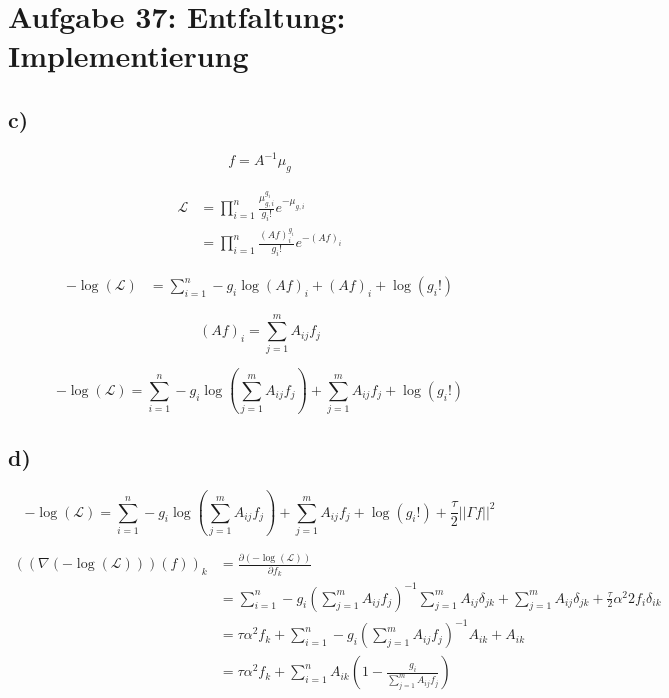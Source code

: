 \section*{Aufgabe 37: Entfaltung: Implementierung}
\label{sec:Aufgabe1}

\subsection*{c)}

\begin{equation}
    f = A^{-1}\mu_g
\end{equation}

\begin{align}
    \mathcal{L} &= \prod_{i=1}^n \frac{\mu_{g,i}^{g_i}}{g_i!}e^{-\mu_{g,i}}\nonumber\\
                &= \prod_{i=1}^n \frac{\left(Af\right)_i^{g_i}}{g_i!}e^{-\left(Af\right)_i}
\end{align}

\begin{align}
    -\log\left(\mathcal{L}\right) &= \sum_{i=1}^n -g_i \log\left(Af\right)_i + \left(Af\right)_i + \log\left(g_i!\right)
\end{align}

\begin{equation}
    \left(Af\right)_i = \sum_{j=1}^m A_{ij}f_j
\end{equation}

\begin{equation}
    -\log\left(\mathcal{L}\right) = \sum_{i=1}^n -g_i \log\left(\sum_{j=1}^m A_{ij}f_j\right) + \sum_{j=1}^m A_{ij}f_j + \log\left(g_i!\right)
\end{equation}
\subsection*{d)}

\begin{equation}
    -\log\left(\mathcal{L}\right) = \sum_{i=1}^n -g_i \log\left(\sum_{j=1}^m A_{ij}f_j\right) + \sum_{j=1}^m A_{ij}f_j + \log\left(g_i!\right) + \frac{\tau}{2}||\Gamma f||^2
\end{equation}

\begin{align}
    \left(\left(\nabla\left(-\log\left(\mathcal{L}\right)\right)\right)\left(f\right)\right)_k &= \frac{\partial \left(-\log\left(\mathcal{L}\right)\right)}{\partial f_k}\nonumber\\
                                        &= \sum_{i=1}^n -g_i \left(\sum_{j=1}^m A_{ij}f_j\right)^{-1}\sum_{j=1}^m A_{ij}\delta_{jk} + \sum_{j=1}^m A_{ij}\delta_{jk} + \frac{\tau}{2} \alpha^2 2f_i \delta_{ik}\nonumber\nonumber\\
                                        &= \tau \alpha^2 f_k + \sum_{i=1}^n -g_i \left(\sum_{j=1}^m A_{ij}f_j\right)^{-1} A_{ik} + A_{ik} \nonumber\\
                                        &= \tau \alpha^2 f_k + \sum_{i=1}^n A_{ik} \left(1-\frac{g_i}{\sum_{j=1}^m A_{ij}f_j}\right)
\end{align}

